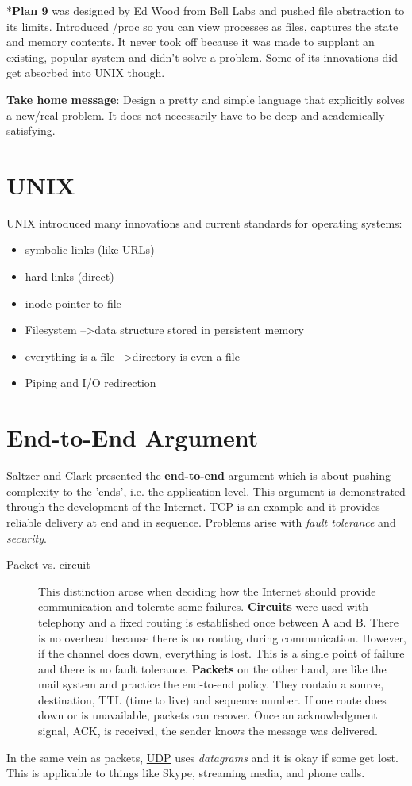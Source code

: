 \documentclass[twoside]{article}
\begin{document}
\begin{footnotesize}
*\textbf{Plan 9} was designed by Ed Wood from Bell Labs and pushed file abstraction to its limits. Introduced /proc so you can view processes as files, captures the state and memory contents. It never took off because it was made to supplant an existing, popular system and didn't solve a problem. Some of its innovations did get absorbed into UNIX though.\\
\end{footnotesize}


\textbf{Take home message}: Design a pretty and simple language that explicitly solves a new/real problem. It does not necessarily have to be deep and academically satisfying. 
\section{UNIX}
UNIX introduced many innovations and current standards for operating systems:
\begin{itemize}
\item symbolic links (like URLs)
\item hard links (direct)
\item inode pointer to file
\item  Filesystem --\textgreater data structure stored in persistent memory
\item everything is a file --\textgreater directory is even a file
\item Piping and I/O redirection
\end{itemize}
\section{End-to-End Argument}
Saltzer and Clark presented the \textbf{end-to-end} argument which is about pushing complexity to the 'ends', i.e. the application level. This argument is demonstrated through the development of the Internet. \underline{TCP} is an example and it provides reliable delivery at end and in sequence. Problems arise with \emph{fault tolerance} and \emph{security}. 
\begin{description}
\item[Packet vs. circuit] This distinction arose when deciding how the Internet should provide communication and tolerate some failures. \textbf{Circuits} were used with telephony and a fixed routing is established once between A and B. There is no overhead because there is no routing during communication. However, if the channel does down, everything is lost. This is a single point of failure and there is no fault tolerance. \textbf{Packets} on the other hand, are like the mail system and practice the end-to-end policy. They contain a source, destination, TTL (time to live) and sequence number. If one route does down or is unavailable, packets can recover. Once an acknowledgment signal, ACK, is received, the sender knows the message was delivered. 
\end{description}
In the same vein as packets, \underline{UDP} uses \emph{datagrams} and it is okay if some get lost. This is applicable to things like Skype, streaming media, and phone calls. 
\end{document}
